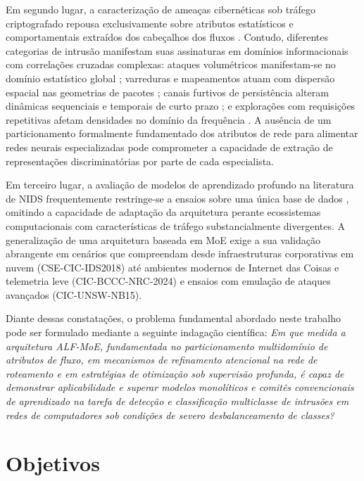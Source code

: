 Em segundo lugar, a caracterização de ameaças cibernéticas sob tráfego criptografado repousa exclusivamente sobre atributos estatísticos e comportamentais extraídos dos cabeçalhos dos fluxos \cite{standard2021, trafficmoe2026}. 
Contudo, diferentes categorias de intrusão manifestam suas assinaturas em domínios informacionais com correlações cruzadas complexas: ataques volumétricos manifestam-se no domínio estatístico global \cite{standard2021}; varreduras e mapeamentos atuam com dispersão espacial nas geometrias de pacotes \cite{wang2023deep}; canais furtivos de persistência alteram dinâmicas sequenciais e temporais de curto prazo \cite{timematters2025, cao2022applsci}; e explorações com requisições repetitivas afetam densidades no domínio da frequência \cite{ugr162021, borgioli2024cae}. 
A ausência de um particionamento formalmente fundamentado dos atributos de rede para alimentar redes neurais especializadas pode comprometer a capacidade de extração de representações discriminatórias por parte de cada especialista.

Em terceiro lugar, a avaliação de modelos de aprendizado profundo na literatura de NIDS frequentemente restringe-se a ensaios sobre uma única base de dados \cite{standard2021, advancedids2024}, omitindo a capacidade de adaptação da arquitetura perante ecossistemas computacionais com características de tráfego substancialmente divergentes. A generalização de uma arquitetura baseada em MoE exige a sua validação abrangente em cenários que compreendam desde infraestruturas corporativas em nuvem (CSE-CIC-IDS2018) até ambientes modernos de Internet das Coisas e telemetria leve (CIC-BCCC-NRC-2024) e ensaios com emulação de ataques avançados (CIC-UNSW-NB15).

Diante dessas constatações, o problema fundamental abordado neste trabalho pode ser formulado mediante a seguinte indagação científica: \emph{Em que medida a arquitetura ALF-MoE, fundamentada no particionamento multidomínio de atributos de fluxo, em mecanismos de refinamento atencional na rede de roteamento e em estratégias de otimização sob supervisão profunda, é capaz de demonstrar aplicabilidade e superar modelos monolíticos e comitês convencionais de aprendizado na tarefa de detecção e classificação multiclasse de intrusões em redes de computadores sob condições de severo desbalanceamento de classes?}

\section{Objetivos}
\label{sec:objetivos}


